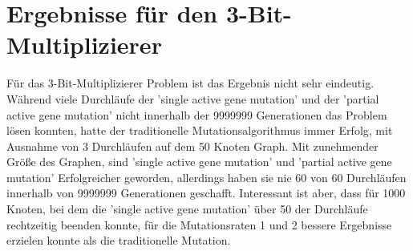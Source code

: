 \begin{table}[!ht]
\centering 
\caption{Resultate der Versuchsreihe für das Paritätsproblem mit sieben Eingabeknoten.}
\label{table_meta3}
\end{table}



\section{Ergebnisse für den 3-Bit-Multiplizierer}

Für das 3-Bit-Multiplizierer Problem ist das Ergebnis nicht sehr eindeutig. Während viele Durchläufe der 'single active gene mutation' und der 'partial active gene mutation' nicht innerhalb der 9999999 Generationen das Problem lösen konnten, hatte der traditionelle Mutationsalgorithmus immer Erfolg, mit Ausnahme von 3 Durchläufen auf dem 50 Knoten Graph. Mit zunehmender Größe des Graphen, sind 'single active gene mutation' und 'partial active gene mutation' Erfolgreicher geworden, allerdings haben sie nie 60 von 60 Durchläufen innerhalb von 9999999 Generationen geschafft. Interessant ist aber, dass für 1000 Knoten, bei dem die 'single active gene mutation' über 50 der Durchläufe rechtzeitig beenden konnte, für die Mutationsraten 1 und 2 bessere Ergebnisse erzielen konnte als die traditionelle Mutation.

